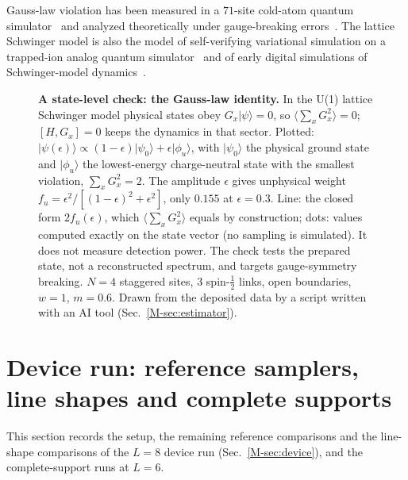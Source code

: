 \documentclass[aps,prb,onecolumn,superscriptaddress,longbibliography,floatfix]{revtex4-2}
\newcommand{\onecolfig}{\setlength{\columnwidth}{0.65\textwidth}}
\begin{document}
Gauss-law violation has been measured in a $71$-site cold-atom quantum simulator~\cite{Gauss2020} and analyzed theoretically under gauge-breaking errors~\cite{HalimehHauke2020}. The lattice Schwinger model is also the model of self-verifying variational simulation on a trapped-ion analog quantum simulator~\cite{Kokail2019} and of early digital simulations of Schwinger-model dynamics~\cite{Martinez2016,Klco2018}.

\begin{figure}[tbp]
\centering\onecolfig

\caption{\textbf{A state-level check: the Gauss-law identity.} In the U(1) lattice Schwinger model physical states obey $G_x|\psi\rangle=0$, so $\langle\sum_x G_x^2\rangle=0$; $[H,G_x]=0$ keeps the dynamics in that sector. Plotted: $|\psi(\epsilon)\rangle\propto(1-\epsilon)|\psi_0\rangle+\epsilon|\phi_u\rangle$, with $|\psi_0\rangle$ the physical ground state and $|\phi_u\rangle$ the lowest-energy charge-neutral state with the smallest violation, $\sum_xG_x^2=2$. The amplitude $\epsilon$ gives unphysical weight $f_u=\epsilon^2/[(1-\epsilon)^2+\epsilon^2]$, only $0.155$ at $\epsilon=0.3$. Line: the closed form $2f_u(\epsilon)$, which $\langle\sum_xG_x^2\rangle$ equals by construction; dots: values computed exactly on the state vector (no sampling is simulated). It does not measure detection power. The check tests the prepared state, not a reconstructed spectrum, and targets gauge-symmetry breaking. $N=4$ staggered sites, $3$ spin-$\tfrac12$ links, open boundaries, $w=1$, $m=0.6$. Drawn from the deposited data by a script written with an AI tool (Sec.~\ref{M-sec:estimator}).}
\label{fig:gauss}
\end{figure}

\section{Device run: reference samplers, line shapes and complete supports}
\label{app:device}
This section records the setup, the remaining reference comparisons and the line-shape comparisons of the $L=8$ device run (Sec.~\ref{M-sec:device}), and the complete-support runs at $L=6$.
\end{document}
